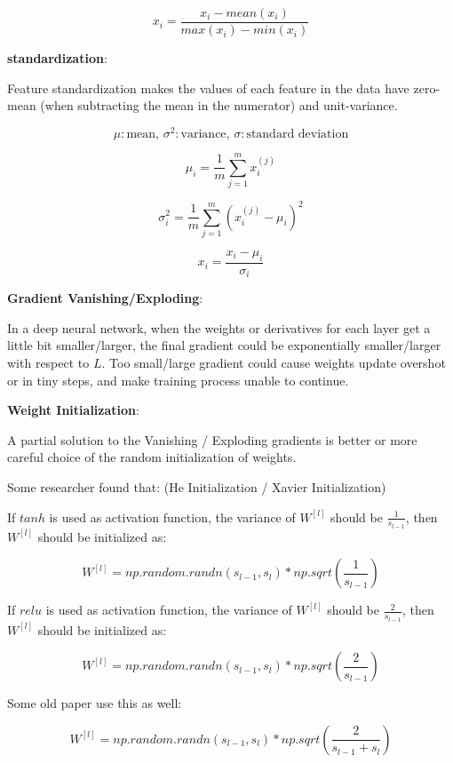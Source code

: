 \documentclass{article}
\begin{document}
\[x_i = \frac{x_i - mean(x_i)}{max(x_i) - min(x_i)}\]

\bigskip

\noindent \textbf{standardization}:

\noindent Feature standardization makes the values of each feature in the data have zero-mean (when subtracting the mean in the numerator) and unit-variance.

\[\mu: \text{mean, } \sigma^2: \text{variance, } \sigma: \text{standard deviation}\]

\[\mu_i ={\frac {1}{m}}\sum _{j=1}^{m}x^{(j)}_{i}\]

\[\sigma^2_i = \frac{1}{m} \sum_{j = 1}^m (x^{(j)}_i - \mu_i)^2\]

\[x_i = \frac{x_i - \mu_i}{\sigma_i}\]

\noindent \textbf{Gradient Vanishing/Exploding}:

\noindent In a deep neural network, when the weights or derivatives for each layer get a little bit smaller/larger, the final gradient could be exponentially smaller/larger with respect to \(L\). Too small/large gradient could cause weights update overshot or in tiny steps, and make training process unable to continue.

\bigskip

\noindent \textbf{Weight Initialization}:

\noindent A partial solution to the Vanishing / Exploding gradients is better or more careful choice of the random initialization of weights. 

\bigskip

\noindent Some researcher found that: (He Initialization / Xavier Initialization)

\bigskip

\noindent If \(tanh\) is used as activation function, the variance of \(W^{[l]}\) should be \(\frac{1}{s_{l - 1}}\), then \(W^{[l]}\) should be initialized as:

\[W^{[l]} = np.random.randn(s_{l - 1}, s_l) * np.sqrt(\frac{1}{s_{l - 1}}) \]

\noindent If \(relu\) is used as activation function, the variance of \(W^{[l]}\) should be \(\frac{2}{s_{l - 1}}\), then \(W^{[l]}\) should be initialized as:

\[W^{[l]} = np.random.randn(s_{l - 1}, s_l) * np.sqrt(\frac{2}{s_{l - 1}}) \]

\noindent Some old paper use this as well:

\[W^{[l]} = np.random.randn(s_{l - 1}, s_l) * np.sqrt(\frac{2}{s_{l - 1} + s_{l}}) \]
\end{document}
